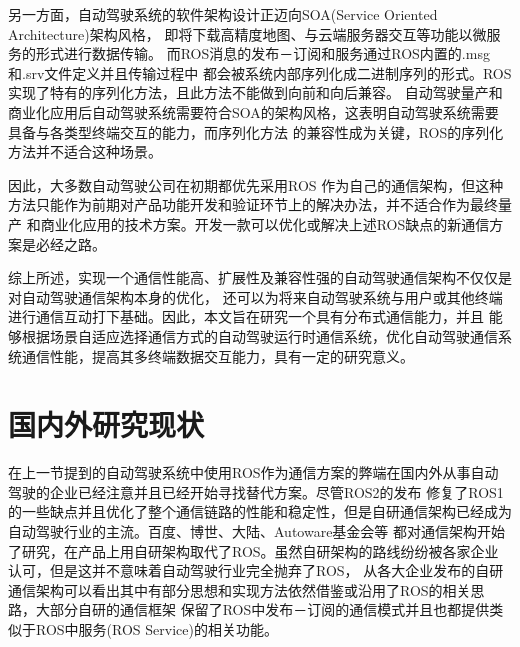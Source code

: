 另一方面，自动驾驶系统的软件架构设计正迈向SOA(Service Oriented Architecture)架构风格，
即将下载高精度地图、与云端服务器交互等功能以微服务的形式进行数据传输。
而ROS消息的发布－订阅和服务通过ROS内置的.msg和.srv文件定义并且传输过程中
都会被系统内部序列化成二进制序列的形式。ROS实现了特有的序列化方法，且此方法不能做到向前和向后兼容。
自动驾驶量产和商业化应用后自动驾驶系统需要符合SOA的架构风格，这表明自动驾驶系统需要具备与各类型终端交互的能力，而序列化方法
的兼容性成为关键，ROS的序列化方法并不适合这种场景。

因此，大多数自动驾驶公司在初期都优先采用ROS
作为自己的通信架构，但这种方法只能作为前期对产品功能开发和验证环节上的解决办法，并不适合作为最终量产
和商业化应用的技术方案。开发一款可以优化或解决上述ROS缺点的新通信方案是必经之路\cite{xml}。

综上所述，实现一个通信性能高、扩展性及兼容性强的自动驾驶通信架构不仅仅是对自动驾驶通信架构本身的优化，
还可以为将来自动驾驶系统与用户或其他终端进行通信互动打下基础。因此，本文旨在研究一个具有分布式通信能力，并且
能够根据场景自适应选择通信方式的自动驾驶运行时通信系统，优化自动驾驶通信系统通信性能，提高其多终端数据交互能力，具有一定的研究意义。

\section{国内外研究现状}
在上一节提到的自动驾驶系统中使用ROS作为通信方案的弊端在国内外从事自动驾驶的企业已经注意并且已经开始寻找替代方案。尽管ROS2的发布
修复了ROS1的一些缺点并且优化了整个通信链路的性能和稳定性，但是自研通信架构已经成为自动驾驶行业的主流。百度、博世、大陆、Autoware基金会等
都对通信架构开始了研究，在产品上用自研架构取代了ROS。虽然自研架构的路线纷纷被各家企业认可，但是这并不意味着自动驾驶行业完全抛弃了ROS，
从各大企业发布的自研通信架构可以看出其中有部分思想和实现方法依然借鉴或沿用了ROS的相关思路，大部分自研的通信框架
保留了ROS中发布－订阅的通信模式并且也都提供类似于ROS中服务(ROS Service)的相关功能。
